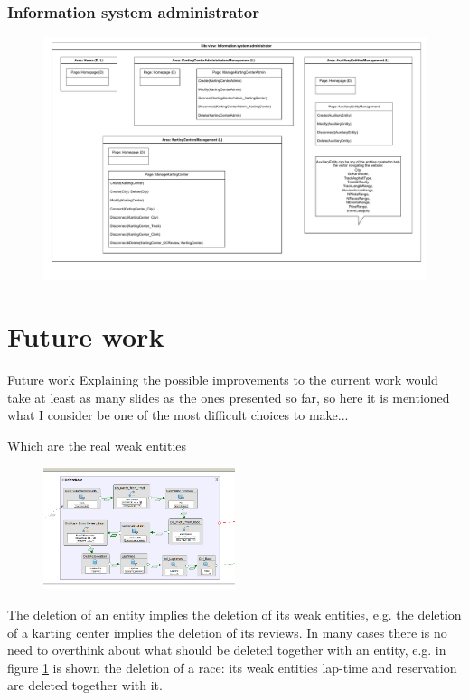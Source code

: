 \documentclass{beamer}
\begin{document}
\begin{frame}
    \frametitle{Information system administrator}
    \begin{figure}
        \centering
        \includegraphics[width=1\textwidth]{drawio/is-admin-view.pdf}
    \end{figure}
\end{frame}

\section{Future work}
\begin{frame}{Future work}
Explaining the possible improvements to the current work
would take at least as many slides as the ones presented so far,
so here it is mentioned what I consider be one of the most difficult choices 
to make...
\end{frame}

\begin{frame}{Which are the real weak entities}
    \scriptsize
    \begin{figure}
        \centering
        \includegraphics[width=0.5\textwidth]{drawio/del-race.png}
        \label{fig:delete-race}
    \end{figure} 
    The deletion of an entity implies the deletion of its weak entities, 
    e.g. the deletion of a karting center implies the deletion of its reviews.
    In many cases there is no need to overthink about what should be deleted together 
    with an entity, e.g. in figure \ref{fig:delete-race} is shown the deletion 
    of a race: its weak entities lap-time and reservation are deleted together with it.
\end{frame}
\end{document}
